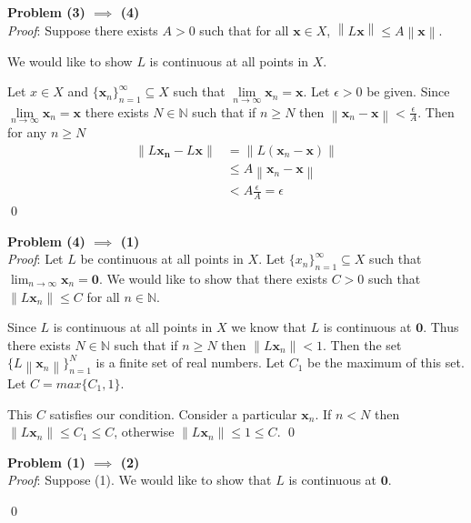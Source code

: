 \documentclass[12pt]{article}
\newcommand{\problem}[1]{\hspace{-4 ex} \large \textbf{Problem #1} }
\newcommand{\norm}[1]{\left\lVert#1\right\rVert}
\renewenvironment{proof}{\hspace{-4 ex} \emph{Proof}:}{\qed}
\newcommand{\NN}{\mathbb{N}}
\renewcommand{\vec}[1]{\boldsymbol{#1}}
\begin{document}
\problem{(3) $\implies$ (4)} \\
\begin{proof}
	Suppose there exists $A>0$ such that for all $\vec{x} \in X$, $\norm{L\vec{x}} \leq A \norm{\vec{x}}$. \bigbreak
	
	We would like to show $L$ is continuous at all points in $X$. \bigbreak
	
	Let $x \in X$ and $\{\vec{x}_n\}_{n=1}^\infty \subseteq X$ such that $\lim\limits_{n\to \infty} \vec{x}_n = \vec{x}$. Let $\epsilon >0$ be given. Since $\lim\limits_{n\to \infty} \vec{x}_n = \vec{x}$ there exists $N \in \NN$ such that if $n\geq N$ then $\norm{\vec{x}_n - \vec{x}} < \frac{\epsilon}{A}$. Then for any $n \geq N$
	\begin{align*}
		\norm{L \vec{x_n} - L\vec{x}} & = \norm{L(\vec{x}_n - \vec{x})} \\
		& \leq A \norm{\vec{x}_n - \vec{x}} \\
		& < A \frac{\epsilon}{A} = \epsilon
	\end{align*}
\end{proof}



\problem{(4) $\implies$ (1)} \\
\begin{proof}
	Let $L$ be continuous at all points in $X$. Let $\{x_n\}_{n=1}^\infty \subseteq X$ such that $\lim_{n \to \infty} \vec{x}_n = \vec{0}$. We would like to show that there exists $C>0$ such that $\norm{L\vec{x}_n} \leq C$ for all $n \in \NN$. \bigbreak
	
	Since $L$ is continuous at all points in $X$ we know that $L$ is continuous at $\vec{0}$. Thus there exists $N \in \NN$ such that if $n \geq N$ then $\norm{L\vec{x}_n} < 1$. Then the set $\{ L\norm{\vec{x}_n} \}_{n=1}^N$ is a finite set of real numbers. Let $C_1$ be the maximum of this set. Let $C = max\{C_1, 1\}$. \bigbreak
	
	This $C$ satisfies our condition. Consider a particular $\vec{x}_n$. If $n<N$ then $\norm{L\vec{x}_n} \leq C_1 \leq C$, otherwise $\norm{L\vec{x}_n} \leq 1 \leq C$.
\end{proof}

\problem{(1) $\implies$ (2)} \\
\begin{proof}
	Suppose (1). We would like to show that $L$ is continuous at $\vec{0}$. \bigbreak
	
	
\end{proof}

\end{document}
